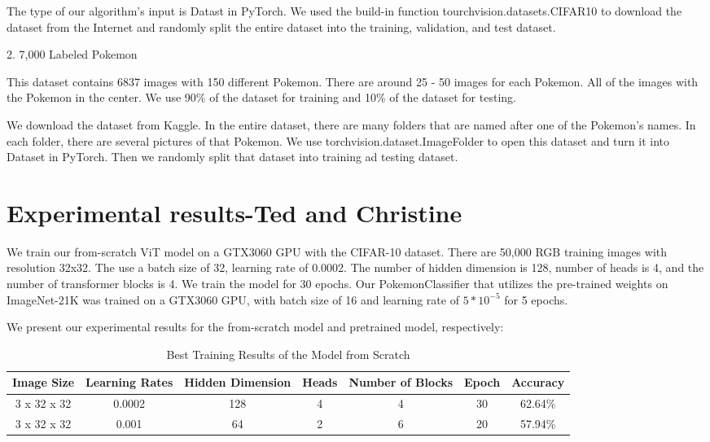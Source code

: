 \documentclass{article} %
\begin{document}
The type of our algorithm's input is Datast in PyTorch. We used the build-in function 
tourchvision.datasets.CIFAR10 to download the dataset from the Internet and randomly split 
the entire dataset into the training, validation, and test dataset. 

2. 7,000 Labeled Pokemon

This dataset contains 6837 images with 150 different Pokemon. There are around 25 - 50 
images for each Pokemon. All of the images with the Pokemon in the center. We use 90\% of 
the dataset for training and 10\% of the dataset for testing.

We download the dataset from Kaggle. In the entire dataset, there are many folders that 
are named after one of the Pokemon's names. In each folder, there are several pictures 
of that Pokemon. We use torchvision.dataset.ImageFolder to open this dataset and turn it 
into Dataset in PyTorch. Then we randomly split that dataset into training ad testing 
dataset.


\section{Experimental results-Ted and Christine}
\label{headings}
We train our from-scratch ViT model on a GTX3060 GPU with the CIFAR-10 dataset. There are 50,000 RGB training images
with resolution 32x32. The use a batch size of 32, learning rate of 0.0002. The number of hidden dimension is 128,
number of heads is 4, and the number of transformer blocks is 4. We train the model for 30 epochs. Our PokemonClassifier
that utilizes the pre-trained weights on ImageNet-21K was trained on a GTX3060 GPU, with batch size of 16 and learning 
rate of $5 * 10^{-5}$ for 5 epochs. 

We present our experimental results for the from-scratch model and pretrained model, respectively:


\begin{table}[ht]
  \centering
    \begin{tabular}{ c | c | c | c | c  | c | c }
      \hline
      Image Size & Learning Rates & Hidden Dimension & Heads & Number of Blocks & Epoch & Accuracy \\ \hline
      3 x 32 x 32 & 0.0002 & 128 & 4 & 4 & 30 & 62.64\% \\ \hline
      3 x 32 x 32 & 0.001 & 64 & 2 & 6 & 20 & 57.94\% \\ \hline
    \end{tabular}
    \caption{Best Training Results of the Model from Scratch}
  \label{tab:my_label}
\end{table}
\end{document}
